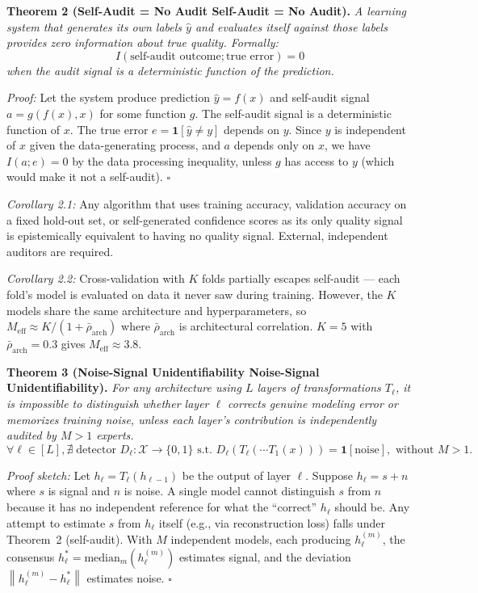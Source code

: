 \documentclass[12pt,a4paper]{article}
\theoremstyle{definition}
\newcommand{\cX}{\mathcal{X}}
\newcommand{\ind}[1]{\mathbf{1}[#1]}
\newcommand{\norm}[1]{\left\lVert#1\right\rVert}
\begin{document}
\medskip
\noindent\textbf{Theorem 2 (Self-Audit = No Audit Self-Audit = No Audit).} \textit{A learning system that generates its own labels $\hat{y}$ and evaluates itself against those labels provides zero information about true quality. Formally:}
\begin{equation}\label{eq:thm2}
    I(\text{self-audit outcome}; \text{true error}) = 0
\end{equation}
\textit{when the audit signal is a deterministic function of the prediction.}

\textit{Proof:} Let the system produce prediction $\hat{y} = f(x)$ and self-audit signal $a = g(f(x), x)$ for some function $g$. The self-audit signal is a deterministic function of $x$. The true error $e = \ind{\hat{y} \neq y}$ depends on $y$. Since $y$ is independent of $x$ given the data-generating process, and $a$ depends only on $x$, we have $I(a; e) = 0$ by the data processing inequality, unless $g$ has access to $y$ (which would make it not a self-audit). \hfill $\square$

\textit{Corollary 2.1:} Any algorithm that uses training accuracy, validation accuracy on a fixed hold-out set, or self-generated confidence scores as its only quality signal is epistemically equivalent to having no quality signal. External, independent auditors are required.

\textit{Corollary 2.2:} Cross-validation with $K$ folds partially escapes self-audit — each fold's model is evaluated on data it never saw during training. However, the $K$ models share the same architecture and hyperparameters, so $M_{\text{eff}} \approx K/(1 + \bar{\rho}_{\text{arch}})$ where $\bar{\rho}_{\text{arch}}$ is architectural correlation. $K=5$ with $\bar{\rho}_{\text{arch}}=0.3$ gives $M_{\text{eff}} \approx 3.8$.

\medskip
\noindent\textbf{Theorem 3 (Noise-Signal Unidentifiability Noise-Signal Unidentifiability).} \textit{For any architecture using $L$ layers of transformations $T_\ell$, it is impossible to distinguish whether layer $\ell$ corrects genuine modeling error or memorizes training noise, unless each layer's contribution is independently audited by $M > 1$ experts.}
\begin{equation}\label{eq:thm3}
    \forall \ell \in [L], \nexists \; \text{detector } D_\ell: \cX \to \{0,1\} \text{ s.t. } D_\ell(T_\ell(\cdots T_1(x))) = \ind{\text{noise}}, \text{ without } M>1.
\end{equation}

\textit{Proof sketch:} Let $h_\ell = T_\ell(h_{\ell-1})$ be the output of layer $\ell$. Suppose $h_\ell = s + n$ where $s$ is signal and $n$ is noise. A single model cannot distinguish $s$ from $n$ because it has no independent reference for what the ``correct'' $h_\ell$ should be. Any attempt to estimate $s$ from $h_\ell$ itself (e.g., via reconstruction loss) falls under Theorem~2 (self-audit). With $M$ independent models, each producing $h_\ell^{(m)}$, the consensus $h_\ell^* = \text{median}_m(h_\ell^{(m)})$ estimates signal, and the deviation $\norm{h_\ell^{(m)} - h_\ell^*}$ estimates noise. \hfill $\square$
\end{document}
